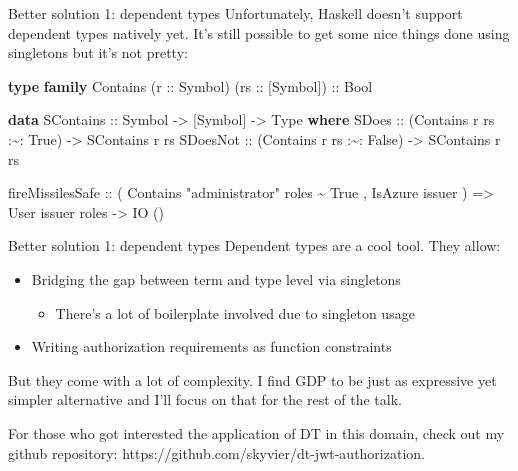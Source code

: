 \documentclass[
  9pt,
  ignorenonframetext,
]{beamer}
\newenvironment{Shaded}{}{}
\newcommand{\DataTypeTok}[1]{\textcolor[rgb]{0.56,0.13,0.00}{#1}}
\newcommand{\KeywordTok}[1]{\textcolor[rgb]{0.00,0.44,0.13}{\textbf{#1}}}
\newcommand{\NormalTok}[1]{#1}
\newcommand{\OperatorTok}[1]{\textcolor[rgb]{0.40,0.40,0.40}{#1}}
\newcommand{\OtherTok}[1]{\textcolor[rgb]{0.00,0.44,0.13}{#1}}
\newcommand{\StringTok}[1]{\textcolor[rgb]{0.25,0.44,0.63}{#1}}
\providecommand{\tightlist}{%
  \setlength{\itemsep}{0pt}\setlength{\parskip}{0pt}}
\begin{document}
\begin{frame}[fragile]{Better solution 1: dependent types}
\protect\hypertarget{better-solution-1-dependent-types-1}{}
Unfortunately, Haskell doesn't support dependent types natively yet.
It's still possible to get some nice things done using singletons but
it's not pretty:

\begin{Shaded}
\begin{Highlighting}[]
\KeywordTok{type} \KeywordTok{family} \DataTypeTok{Contains}\NormalTok{ (}\OtherTok{r ::} \DataTypeTok{Symbol}\NormalTok{) (}\OtherTok{rs ::}\NormalTok{ [}\DataTypeTok{Symbol}\NormalTok{])}\OtherTok{ ::} \DataTypeTok{Bool}

\KeywordTok{data} \DataTypeTok{SContains}\OtherTok{ ::} \DataTypeTok{Symbol} \OtherTok{{-}\textgreater{}}\NormalTok{ [}\DataTypeTok{Symbol}\NormalTok{] }\OtherTok{{-}\textgreater{}} \DataTypeTok{Type} \KeywordTok{where}
  \DataTypeTok{SDoes}\OtherTok{ ::}\NormalTok{ (}\DataTypeTok{Contains}\NormalTok{ r rs }\OperatorTok{:\textasciitilde{}:} \DataTypeTok{\textquotesingle{}True}\NormalTok{) }\OtherTok{{-}\textgreater{}} \DataTypeTok{SContains}\NormalTok{ r rs}
  \DataTypeTok{SDoesNot}\OtherTok{ ::}\NormalTok{ (}\DataTypeTok{Contains}\NormalTok{ r rs }\OperatorTok{:\textasciitilde{}:} \DataTypeTok{\textquotesingle{}False}\NormalTok{) }\OtherTok{{-}\textgreater{}} \DataTypeTok{SContains}\NormalTok{ r rs}

\NormalTok{fireMissilesSafe}
\OtherTok{  ::}\NormalTok{ ( }\DataTypeTok{Contains} \StringTok{"administrator"}\NormalTok{ roles }\OperatorTok{\textasciitilde{}} \DataTypeTok{\textquotesingle{}True}
\NormalTok{     , }\DataTypeTok{IsAzure}\NormalTok{ issuer}
\NormalTok{     )}
  \OtherTok{=\textgreater{}} \DataTypeTok{User}\NormalTok{ issuer roles}
  \OtherTok{{-}\textgreater{}} \DataTypeTok{IO}\NormalTok{ ()}
\end{Highlighting}
\end{Shaded}
\end{frame}

\begin{frame}{Better solution 1: dependent types}
\protect\hypertarget{better-solution-1-dependent-types-2}{}
Dependent types are a cool tool. They allow:

\begin{itemize}
\tightlist
\item
  Bridging the gap between term and type level via singletons

  \begin{itemize}
  \tightlist
  \item
    There's a lot of boilerplate involved due to singleton usage
  \end{itemize}
\item
  Writing authorization requirements as function constraints
\end{itemize}

But they come with a lot of complexity. I find GDP to be just as
expressive yet simpler alternative and I'll focus on that for the rest
of the talk.

For those who got interested the application of DT in this domain, check
out my github repository:
https://github.com/skyvier/dt-jwt-authorization.
\end{frame}
\end{document}
